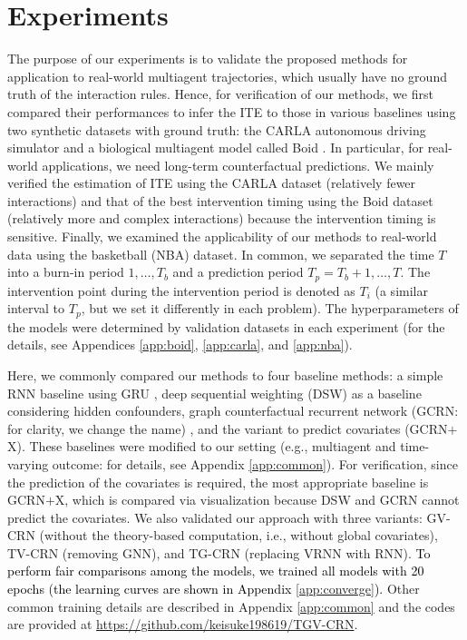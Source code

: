 \documentclass[journal]{IEEEtran}
\begin{document}
\section{Experiments}
\label{sec:experiments}
The purpose of our experiments is to validate the proposed methods for application to real-world multiagent trajectories, which usually have no ground truth of the interaction rules. 
Hence, for verification of our methods, we first compared their performances to infer the ITE to those in various baselines using two synthetic datasets with ground truth: the CARLA \cite{dosovitskiy2017carla} autonomous driving simulator and a biological multiagent model called Boid \cite{Couzin02}.
In particular, for real-world applications, we need long-term counterfactual predictions.
We mainly verified the estimation of ITE using the CARLA dataset (relatively fewer interactions) and that of the best intervention timing using the Boid dataset (relatively more and complex interactions) because the intervention timing is sensitive.
Finally, we examined the applicability of our methods to real-world data using the basketball (NBA) dataset.
In common, we separated the time $T$ into a burn-in period $1,\ldots,T_b$ and a prediction period $T_p = T_b+1,\ldots,T$.
The intervention point during the intervention period is denoted as $T_i$ (a similar interval to $T_p$, but we set it differently in each problem). 
The hyperparameters of the models were determined by validation datasets in each experiment (for the details, see Appendices \ref{app:boid}, \ref{app:carla}, and \ref{app:nba}). 

Here, we commonly compared our methods to four baseline methods: 
a simple RNN baseline using GRU \cite{Cho14},
deep sequential weighting (DSW) \cite{liu2020estimating} as a baseline considering hidden confounders, graph counterfactual recurrent network (GCRN: for clarity, we change the name) \cite{ma2021deconfounding} 
, and the variant to predict covariates (GCRN$+$X).
These baselines were modified to our setting (e.g., multiagent and time-varying outcome: for details, see Appendix \ref{app:common}). 
For verification, since the prediction of the covariates is required, the most appropriate baseline is GCRN$+$X, which is compared via visualization because DSW and GCRN cannot predict the covariates.  
We also validated our approach with three variants: GV-CRN (without the theory-based computation, i.e., without global covariates), TV-CRN (removing GNN), and TG-CRN (replacing VRNN with RNN).
\textcolor{black}{To perform fair comparisons among the models, we trained all models with 20 epochs (the learning curves are shown in Appendix \ref{app:converge}).}
Other common training details 
are described in Appendix \ref{app:common} and the codes are provided at \url{https://github.com/keisuke198619/TGV-CRN}.
\end{document}
